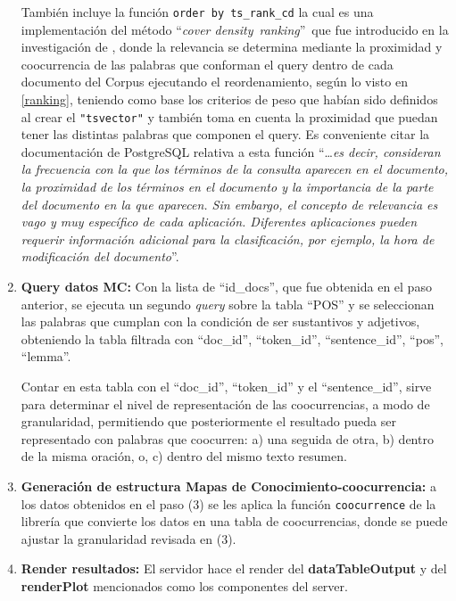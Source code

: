 \documentclass[
  12pt,
  openany]{book}
\begin{document}
\begin{enumerate}
  También incluye la función \texttt{order\ by\ ts\_rank\_cd} la cual es una implementación del método ``\emph{cover density}~\emph{ranking}''~que fue introducido en la investigación de \citep{clarke2000} , donde la relevancia se determina mediante la proximidad y coocurrencia de las palabras que conforman el query dentro de cada documento del Corpus ejecutando el reordenamiento, según lo visto en \ref{ranking}, teniendo como base los criterios de peso que habían sido definidos al crear el \texttt{"tsvector"} y también toma en cuenta la proximidad que puedan tener las distintas palabras que componen el query. Es conveniente citar la documentación de PostgreSQL relativa a esta función ``\ldots{}\emph{es decir, consideran la frecuencia con la que los términos de la consulta aparecen en el documento, la proximidad de los términos en el documento y la importancia de la parte del documento en la que aparecen. Sin embargo, el concepto de relevancia es vago y muy específico de cada aplicación. Diferentes aplicaciones pueden requerir información adicional para la clasificación, por ejemplo, la hora de modificación del documento}''.\\
\item
  \textbf{Query datos MC:} Con la lista de ``id\_docs'', que fue obtenida en el paso anterior, se ejecuta un segundo \emph{query} sobre la tabla ``POS'' y se seleccionan las palabras que cumplan con la condición de ser sustantivos y adjetivos, obteniendo la tabla filtrada con ``doc\_id'', ``token\_id'', ``sentence\_id'', ``pos'', ``lemma''.

  Contar en esta tabla con el ``doc\_id'', ``token\_id'' y el ``sentence\_id'', sirve para determinar el nivel de representación de las coocurrencias, a modo de granularidad, permitiendo que posteriormente el resultado pueda ser representado con palabras que coocurren: a) una seguida de otra, b) dentro de la misma oración, o, c) dentro del mismo texto resumen.
\item
  \textbf{Generación de estructura Mapas de Conocimiento-coocurrencia:} a los datos obtenidos en el paso (3) se les aplica la función \texttt{coocurrence} de la librería \citep{udpipe} que convierte los datos en una tabla de coocurrencias, donde se puede ajustar la granularidad revisada en (3).
\item
  \textbf{Render resultados:} El servidor hace el render del \textbf{dataTableOutput} y del \textbf{renderPlot} mencionados como los componentes del server.
\end{enumerate}
\end{document}
